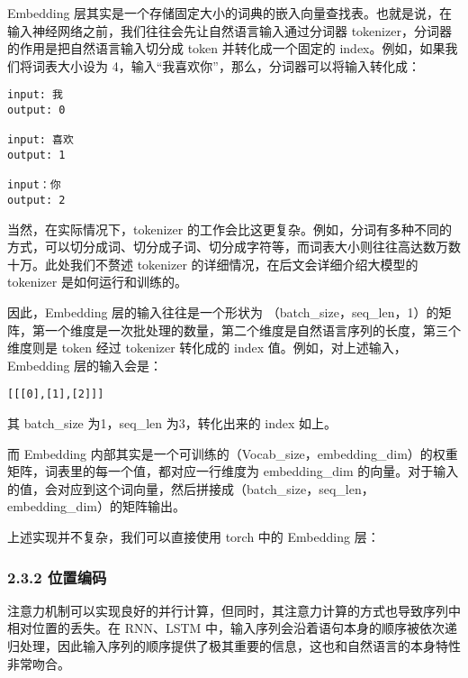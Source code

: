 \documentclass[12pt,a4paper]{book}
\begin{document}
Embedding
层其实是一个存储固定大小的词典的嵌入向量查找表。也就是说，在输入神经网络之前，我们往往会先让自然语言输入通过分词器
tokenizer，分词器的作用是把自然语言输入切分成 token 并转化成一个固定的
index。例如，如果我们将词表大小设为
4，输入``我喜欢你''，那么，分词器可以将输入转化成：

\begin{verbatim}
input: 我
output: 0

input: 喜欢
output: 1

input：你
output: 2
\end{verbatim}

当然，在实际情况下，tokenizer
的工作会比这更复杂。例如，分词有多种不同的方式，可以切分成词、切分成子词、切分成字符等，而词表大小则往往高达数万数十万。此处我们不赘述
tokenizer 的详细情况，在后文会详细介绍大模型的 tokenizer
是如何运行和训练的。

因此，Embedding 层的输入往往是一个形状为
（batch\_size，seq\_len，1）的矩阵，第一个维度是一次批处理的数量，第二个维度是自然语言序列的长度，第三个维度则是
token 经过 tokenizer 转化成的 index 值。例如，对上述输入，Embedding
层的输入会是：

\begin{verbatim}
[[[0],[1],[2]]]
\end{verbatim}

其 batch\_size 为1，seq\_len 为3，转化出来的 index 如上。

而 Embedding
内部其实是一个可训练的（Vocab\_size，embedding\_dim）的权重矩阵，词表里的每一个值，都对应一行维度为
embedding\_dim
的向量。对于输入的值，会对应到这个词向量，然后拼接成（batch\_size，seq\_len，embedding\_dim）的矩阵输出。

上述实现并不复杂，我们可以直接使用 torch 中的 Embedding 层：

\begin{Shaded}
\begin{Highlighting}[]
\OperatorTok{=}
\end{Highlighting}
\end{Shaded}

\subsubsection{2.3.2 位置编码}\label{ux4f4dux7f6eux7f16ux7801}

注意力机制可以实现良好的并行计算，但同时，其注意力计算的方式也导致序列中相对位置的丢失。在
RNN、LSTM
中，输入序列会沿着语句本身的顺序被依次递归处理，因此输入序列的顺序提供了极其重要的信息，这也和自然语言的本身特性非常吻合。
\end{document}
